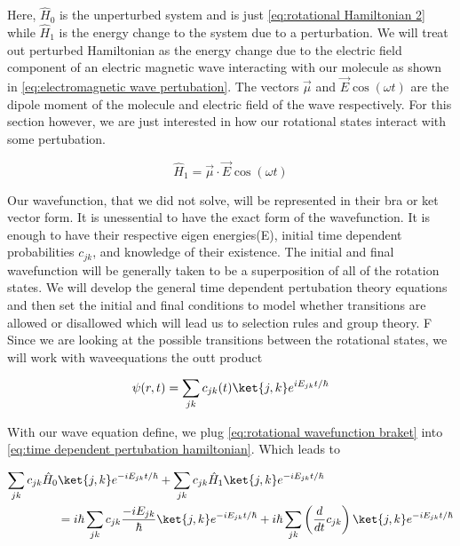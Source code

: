 \documentclass[11pt,a4paper]{book}
\begin{document}
			Here, $\hat{H}_0$ is the unperturbed system and is just \autoref{eq:rotational Hamiltonian 2} while $\hat{H}_1$ is the energy change to the system due to a perturbation. We will treat out perturbed Hamiltonian as the energy change due to the electric field component of an electric magnetic wave interacting with our molecule as shown in \autoref{eq:electromagnetic wave pertubation}. The vectors $\vec{\mu}$ and $\vec{E}\cos{(\omega t)}$ are the dipole moment of the molecule and electric field of the wave respectively. For this section however, we are just interested in how our rotational states interact with some pertubation.
			
			\begin{equation}
				\label{eq:electromagnetic wave pertubation}
				\hat{H}_1 = \vec{\mu}\cdot \vec{E} \cos{(\omega t)}
			\end{equation}
			
			Our wavefunction, that we did not solve, will be represented in their bra or ket vector form. It is unessential to have the exact form of the wavefunction. It is enough to have their respective eigen energies(E), initial time dependent probabilities $c_{jk}$, and knowledge of their existence. The initial and final wavefunction will be generally taken to be a superposition of all of the rotation states. We will develop the general time dependent pertubation theory equations and then set the initial and final conditions to model whether transitions are allowed or disallowed which will lead us to selection rules and group theory. 
			F
			Since we are looking at the possible transitions between the rotational states, we will work with waveequations the outt product
			
			\begin{equation}
				\label{eq:rotational wavefunction braket}
				\psi(r,t)=\sum_{jk} c_{jk}(t) \ket{j,k} e^{iE_{jk}t/\hbar}
			\end{equation}
			
			With our wave equation define, we plug \autoref{eq:rotational wavefunction braket} into \autoref{eq:time dependent pertubation hamiltonian}. Which leads to 
			
			\begin{equation}
				\begin{split}
					\label{eq:time dependent pertubation theory}
					\sum_{jk} c_{jk}\hat{H}_0 &\ket{ j, k}e^{-i E_{jk} t/ \hbar} + 
					\sum_{jk} c_{jk}\hat{H}_1\ket{j, k} e^{-i E_{j k} t/ \hbar} \\
					& =
					i\hbar \sum_{jk} {c}_{jk} \dfrac{-i E_{j k}}{\hbar}\ket{j, k}e^{-i E_{jk} t/ \hbar} +
					i\hbar \sum_{jk} \left(\dfrac{d}{dt}{c}_{jk} \right)  \ket{j, k}e^{-i E_{jk} t/ \hbar}
				\end{split}
			\end{equation}
			
\end{document}
